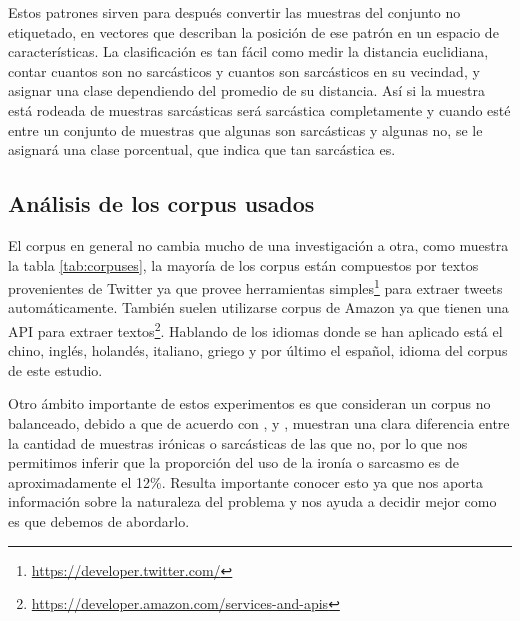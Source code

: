 \par Estos patrones sirven para después convertir las muestras del conjunto no etiquetado, en vectores que describan la posición de ese patrón en un espacio de características. La clasificación es tan fácil como medir la distancia euclidiana, contar cuantos son no sarcásticos y cuantos son sarcásticos en su vecindad, y asignar una clase dependiendo del promedio de su distancia. Así si la muestra está rodeada de muestras sarcásticas será sarcástica completamente y cuando esté entre un conjunto de muestras que algunas son sarcásticas y algunas no, se le asignará una clase porcentual, que indica que tan sarcástica es.

\subsection{Análisis de los corpus usados}

\par El corpus en general no cambia mucho de una investigación a otra, como muestra la tabla \ref{tab:corpuses}, la mayoría de los corpus están compuestos por textos provenientes de Twitter ya que provee herramientas simples\footnote{\url{https://developer.twitter.com/}} para extraer tweets automáticamente. También suelen utilizarse corpus de Amazon ya que tienen una \gls{API} para extraer textos\footnote{ \url{https://developer.amazon.com/services-and-apis}}. Hablando de los idiomas donde se han aplicado está el chino, inglés, holandés, italiano, griego y por último el español, idioma del corpus de este estudio.

\par Otro ámbito importante de estos experimentos es que consideran un corpus no balanceado, debido a que de acuerdo con \cite{reyes2012making}, \cite{lopez2016character} y \cite{barbieri2014italian}, muestran una clara diferencia entre la cantidad de muestras irónicas o sarcásticas de las que no, por lo que nos permitimos inferir que la proporción del uso de la ironía o sarcasmo es de aproximadamente el 12\%. Resulta importante conocer esto ya que nos aporta información sobre la naturaleza del problema y nos ayuda a decidir mejor como es que debemos de abordarlo.


